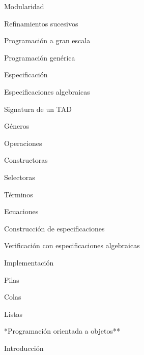 \begin{longenum}
\begin{longenum}
\begin{longenum}
            \begin{longenum}
                \item Modularidad
                \item Refinamientos sucesivos
                \item Programación a gran escala
                \item Programación genérica
            \end{longenum}
        \end{longenum}
        \item Especificación
        \begin{longenum}
            \item Especificaciones algebraicas
            \begin{longenum}
                \item Signatura de un TAD
                \begin{longenum}
                    \item Géneros
                    \item Operaciones
                    \begin{longenum}
                        \item Constructoras
                        \item Selectoras
                    \end{longenum}
                \end{longenum}
                \item Términos
                \item Ecuaciones
            \end{longenum}
            \item Construcción de especificaciones
            \item Verificación con especificaciones algebraicas
        \end{longenum}
        \item Implementación
        \begin{longenum}
            \item Pilas
            \item Colas
            \item Listas
        \end{longenum}
    \end{longenum}
    \item **Programación orientada a objetos**
    \begin{longenum}
        \item Introducción

\end{longenum}
\end{longenum}
